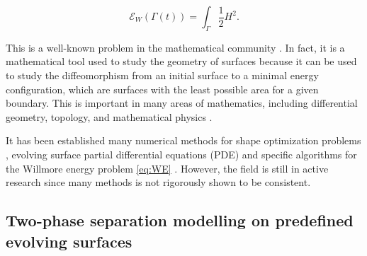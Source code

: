 \begin{equation}
\label{eq:WE}
\mathcal{E} _{W} \left( \Gamma\left( t \right)   \right) = \int_{\Gamma  }^{} \frac{1}{2} H ^2
.\end{equation}

This is a well-known problem in the mathematical community \cite{ topping2000towards, marques2014willmore,link2013gradient,kuwert2012willmore}. In fact, it is a mathematical tool used to study the geometry of surfaces because it can be used to study
the diffeomorphism from an initial surface to a minimal energy configuration, which are surfaces with the least possible area for a given boundary. This is important in many areas of mathematics, including differential geometry, topology, and mathematical physics \cite{koerber2021area,jakob2022singularities, rupp21}.

It has been established many numerical methods for shape optimization problems \cite{sokolowski1992introduction,ito2008variational}, evolving surface partial differential equations (PDE) \cite{dziuk2013finite, dziuk2007finite,
binz2022convergent, barrett2007parametric, barrett2007variational, kovacs2019convergent, lehrenfeld2018stabilized} and specific
algorithms for the Willmore energy problem \eqref{eq:WE} \cite{palmurella2022parametric, dziuk2008computational, bonito2010parametric,  kovacs2021convergent, hu2022evolving}. However, the field is still in active research since many methods is not rigorously shown to be consistent.

\subsection{Two-phase separation modelling on predefined evolving surfaces }%
\label{sub:two_phase_seperation_modelling_on_surfaces_}

